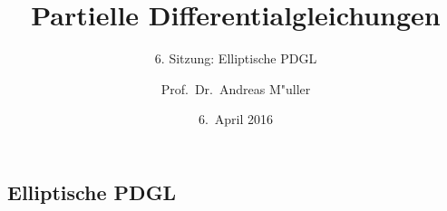 \documentclass{beamer}
\title[]{Partielle Differentialgleichungen}
\subtitle{6. Sitzung: Elliptische PDGL}
\date[6.~April 2016]{6.~April 2016}
\author{Prof.~Dr.~Andreas M"uller}
\begin{document}
\begin{frame}
\section{Elliptische PDGL}
\titlepage
\end{frame}


\end{document}
